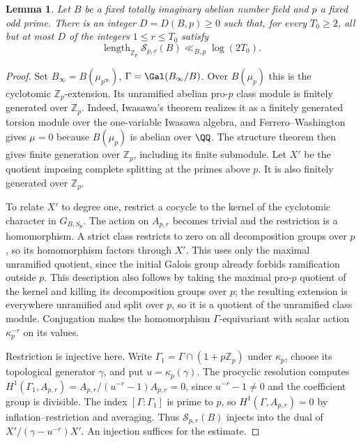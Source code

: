 \documentclass[a4paper,11pt]{article}
\newtheorem{lemma}[proposition]{Lemma}
\theoremstyle{definition}
\theoremstyle{remark}
\newcommand{\ZZ}{\mathbb Z}\newcommand{\ord}{\operatorname{ord}}
\newcommand{\len}{\operatorname{length}}\newcommand{\Res}{\operatorname*{Res}}
\numberwithin{equation}{section}
\newcommand{\Sel}{\mathcal S}
\begin{document}
\begin{lemma}\label{lem:sparse}
Let \(B\) be a fixed totally imaginary abelian number field and \(p\) a fixed odd prime. There is an integer \(D=D(B,p)\ge0\) such that, for every \(T_0\ge2\), all but at most \(D\) of the integers \(1\le r\le T_0\) satisfy
\[
       \len_{\ZZ_p}\Sel_{p,r}(B)\ll_{B,p}\log(2T_0).
\]
\end{lemma}
\begin{proof}
Set \(B_\infty=B(\mu_{p^\infty})\), \(\Gamma=\Gal(B_\infty/B)\). Over \(B(\mu_p)\) this is the cyclotomic \(\ZZ_p\)-extension. Its unramified abelian pro-\(p\) class module is finitely generated over \(\ZZ_p\). Indeed, Iwasawa's theorem realizes it as a finitely generated torsion module over the one-variable Iwasawa algebra, and Ferrero--Washington gives \(\mu=0\) because \(B(\mu_p)\) is abelian over \(\QQ\). The structure theorem then gives finite generation over \(\ZZ_p\), including its finite submodule. Let \(X'\) be the quotient imposing complete splitting at the primes above \(p\). It is also finitely generated over \(\ZZ_p\).~\cite{IV-II-II-iwasawa15,IV-II-III-fw}

To relate \(X'\) to degree one, restrict a cocycle to the kernel of the cyclotomic character in \(G_{B,S_p}\). The action on \(A_{p,r}\) becomes trivial and the restriction is a homomorphism. A strict class restricts to zero on all decomposition groups over \(p\), so its homomorphism factors through \(X'\). This uses only the maximal unramified quotient, since the initial Galois group already forbids ramification outside \(p\). This description also follows by taking the maximal pro-\(p\) quotient of the kernel and killing its decomposition groups over \(p\); the resulting extension is everywhere unramified and split over \(p\), so it is a quotient of the unramified class module. Conjugation makes the homomorphism \(\Gamma\)-equivariant with scalar action \(\kappa_p^{-r}\) on its values.

Restriction is injective here. Write \(\Gamma_1=\Gamma\cap(1+p\ZZ_p)\) under \(\kappa_p\), choose its topological generator \(\gamma\), and put \(u=\kappa_p(\gamma)\). The procyclic resolution computes \(H^1(\Gamma_1,A_{p,r})=A_{p,r}/(u^{-r}-1)A_{p,r}=0\), since \(u^{-r}-1\ne0\) and the coefficient group is divisible. The index \([\Gamma:\Gamma_1]\) is prime to \(p\), so \(H^1(\Gamma,A_{p,r})=0\) by inflation--restriction and averaging. Thus \(\Sel_{p,r}(B)\) injects into the dual of \(X'/(\gamma-u^{-r})X'\). An injection suffices for the estimate.


\end{proof}
\end{document}
